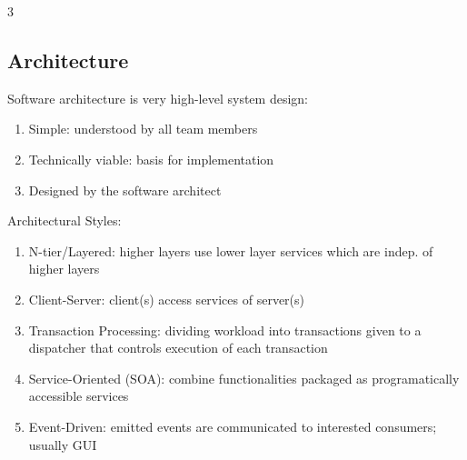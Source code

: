 \documentclass[12pt, a4paper]{article}
\begin{document}
\begin{multicols*}{3}
\subsection{Architecture}
Software architecture is very high-level system design:
\begin{enumerate}[\roman*.]
  \item Simple: understood by all team members
  \item Technically viable: basis for implementation
  \item Designed by the software architect
\end{enumerate}

Architectural Styles:
\begin{enumerate}[\roman*.]
  \item N-tier/Layered: higher layers use lower layer services which are indep. of higher layers
  \item Client-Server: client(s) access services of server(s)
  \item Transaction Processing: dividing workload into transactions given to a dispatcher that controls execution of each transaction 
  \item Service-Oriented (SOA): combine functionalities packaged as programatically accessible services 
  \item Event-Driven: emitted events are communicated to interested consumers; usually GUI
\end{enumerate}
\vspace{-1em}

\end{multicols*}
\end{document}
